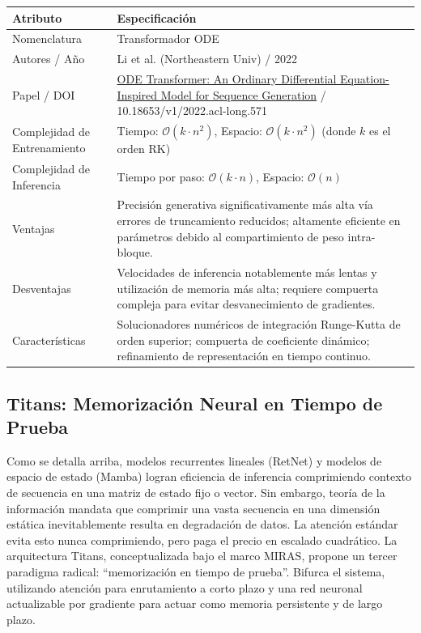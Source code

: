 \documentclass[11pt,a4paper]{article}
\begin{document}
\begin{center}
\begin{tabular}{|l|p{11cm}|}
\hline
\textbf{Atributo} & \textbf{Especificación} \\
\hline
Nomenclatura & Transformador ODE \\
\hline
Autores / Año & Li et al. (Northeastern Univ) / 2022 \\
\hline
Papel / DOI & \href{https://aclanthology.org/2022.acl-long.571/}{ODE Transformer: An Ordinary Differential Equation-Inspired Model for Sequence Generation} / 10.18653/v1/2022.acl-long.571 \\
\hline
Complejidad de Entrenamiento & Tiempo: $\mathcal{O}(k \cdot n^2)$, Espacio: $\mathcal{O}(k \cdot n^2)$ (donde $k$ es el orden RK) \\
\hline
Complejidad de Inferencia & Tiempo por paso: $\mathcal{O}(k \cdot n)$, Espacio: $\mathcal{O}(n)$ \\
\hline
Ventajas & Precisión generativa significativamente más alta vía errores de truncamiento reducidos; altamente eficiente en parámetros debido al compartimiento de peso intra-bloque. \\
\hline
Desventajas & Velocidades de inferencia notablemente más lentas y utilización de memoria más alta; requiere compuerta compleja para evitar desvanecimiento de gradientes. \\
\hline
Características & Solucionadores numéricos de integración Runge-Kutta de orden superior; compuerta de coeficiente dinámico; refinamiento de representación en tiempo continuo. \\
\hline
\end{tabular}
\end{center}

\subsection{Titans: Memorización Neural en Tiempo de Prueba}
\label{subsec:titans}

Como se detalla arriba, modelos recurrentes lineales (RetNet) y modelos de espacio de estado (Mamba) logran eficiencia de inferencia comprimiendo contexto de secuencia en una matriz de estado fijo o vector. Sin embargo, teoría de la información mandata que comprimir una vasta secuencia en una dimensión estática inevitablemente resulta en degradación de datos. La atención estándar evita esto nunca comprimiendo, pero paga el precio en escalado cuadrático. La arquitectura Titans, conceptualizada bajo el marco MIRAS, propone un tercer paradigma radical: ``memorización en tiempo de prueba''. Bifurca el sistema, utilizando atención para enrutamiento a corto plazo y una red neuronal actualizable por gradiente para actuar como memoria persistente y de largo plazo.
\end{document}
